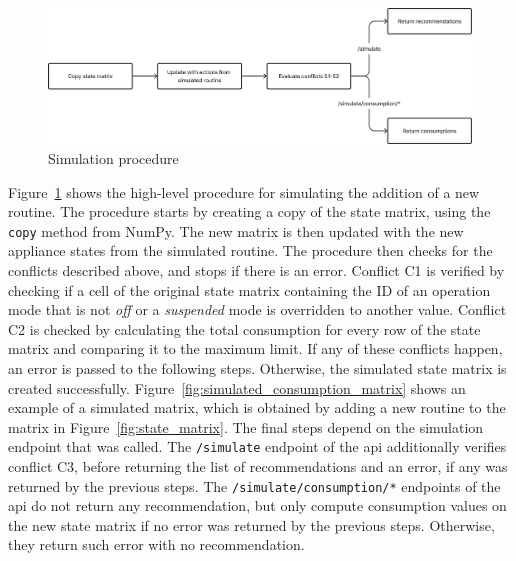 \begin{figure}
    \centering
    \includegraphics[width=\textwidth]{images/simulation_procedure.png}
    \caption{Simulation procedure}%
    \label{fig:simulation_procedure}
\end{figure}

Figure~\ref{fig:simulation_procedure} shows the high-level procedure for simulating the addition of a new routine. The procedure starts by creating a copy of the state matrix, using the \texttt{copy} method from NumPy. The new matrix is then updated with the new appliance states from the simulated routine. The procedure then checks for the conflicts described above, and stops if there is an error. Conflict C1 is verified by checking if a cell of the original state matrix containing the ID of an operation mode that is not \textit{off} or a \textit{suspended} mode is overridden to another value. Conflict C2 is checked by calculating the total consumption for every row of the state matrix and comparing it to the maximum limit. If any of these conflicts happen, an error is passed to the following steps. Otherwise, the simulated state matrix is created successfully. Figure~\ref{fig:simulated_consumption_matrix} shows an example of a simulated matrix, which is obtained by adding a new routine to the matrix in Figure~\ref{fig:state_matrix}. The final steps depend on the simulation endpoint that was called. The \texttt{/simulate} endpoint of the \acrshort{api} additionally verifies conflict C3, before returning the list of recommendations and an error, if any was returned by the previous steps. The \texttt{/simulate/consumption/*} endpoints of the \acrshort{api} do not return any recommendation, but only compute consumption values on the new state matrix if no error was returned by the previous steps. Otherwise, they return such error with no recommendation. 

